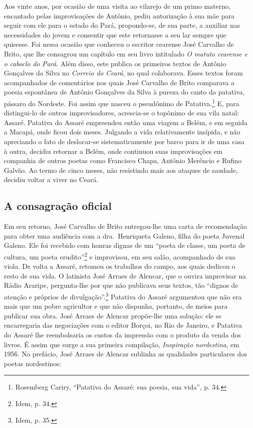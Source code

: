 Aos vinte anos, por ocasião de uma visita ao vilarejo de um primo materno,
encantado pelas improvisações de Antônio, pediu autorização à sua mãe para
seguir com ele para o estado do Pará, propondo-se, de sua parte, a auxiliar nas
necessidades do jovem e consentir que este retornasse a seu lar sempre que
quisesse. Foi nessa ocasião que conheceu o escritor cearense José Carvalho de
Brito, que lhe consagrou um capítulo em seu livro intitulado \textit{O matuto cearense e
o caboclo do Pará}. Além disso, este publica os primeiros textos de Antônio
Gonçalves da Silva no \textit{Correio do Ceará}, no qual colaborava. Esses textos foram
acompanhados de comentários nos quais José Carvalho de Brito comparava a poesia
espontânea de Antônio Gonçalves da Silva à pureza do canto da patativa, pássaro
do Nordeste. Foi assim que nasceu o pseudônimo de Patativa.\footnote{ Rosemberg
Cariry, “Patativa do Assaré: sua poesia, sua vida”, p. 34.} E, para
distingui-lo de outros improvisadores, acrescia-se o topônimo de sua vila natal:
Assaré. Patativa do Assaré empreendeu então uma viagem a Belém, e em seguida a
Macapá, onde ficou dois meses. Julgando a vida relativamente insípida, e não
apreciando o fato de deslocar-se sistematicamente por barco para ir de uma casa
à outra, decidiu retornar a Belém, onde continuou suas improvisações em
companhia de outros poetas como Francisco Chapa, Antônio Merêncio e Rufino
Galvão. Ao termo de cinco meses, não resistindo mais aos ataques de saudade,
decidiu voltar a viver no Ceará.

\subsection{A consagração oficial}

Em seu retorno, José Carvalho de Brito entregou-lhe uma carta de recomendação
para obter uma audiência com a dra.~Henriqueta Galeno, filha do poeta Juvenal
Galeno. Ele foi recebido com honras dignas de um “poeta de classe, um poeta de
cultura, um poeta erudito”\footnote{ Idem, p. 34.} e improvisou, em seu
salão, acompanhado de sua viola. De volta a Assaré, retomou os trabalhos do
campo, aos quais dedicou o resto de sua vida. O latinista José Arraes de
Alencar, que o ouvira improvisar na Rádio Araripe, pergunta-lhe por que não
publicava seus textos, tão “dignos de atenção e próprios de
divulgação”.\footnote{ Idem, p. 35.} Patativa do Assaré argumentou que
não era mais que um pobre agricultor e que não dispunha, portanto, de meios para
publicar sua obra. José Arraes de Alencar propõe-lhe uma solução: ele se
encarregaria das negociações com o editor Borçoi, no Rio de Janeiro, e Patativa
do Assaré lhe reembolsaria os custos da impressão com o produto da venda dos
livros. É assim que surge a sua primeira compilação, \textit{Inspiração nordestina}, em
1956. No prefácio, José Arraes de Alencar sublinha as qualidades particulares
dos poetas nordestinos:

